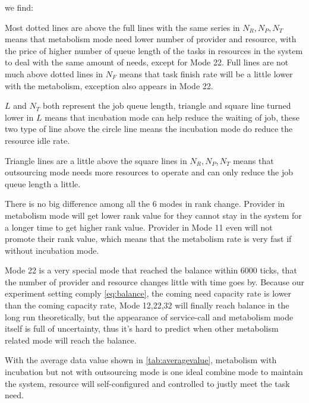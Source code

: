 we find: \begin{asparaenum}[1)]
\item Most dotted lines are above the full lines with the same series in $N_R,N_P,N_T$ means that metabolism mode need lower number of provider and resource, with the price of higher number of queue length of the tasks in resources in the system to deal with the same amount of needs, except for Mode 22. Full lines are not much above dotted lines in $N_F$ means that task finish rate will be a little lower with the metabolism, exception also appears in Mode 22.
\item $L$ and $N_T$ both represent the job queue length, triangle and square line turned lower in $L$ means that incubation mode can help reduce the waiting of job, these two type of line above the circle line means the incubation mode do reduce the resource idle rate.
\item Triangle lines are a little above the square lines in $N_R,N_P,N_T$ means that outsourcing mode needs more resources to operate and can only reduce the job queue length a little.
\item There is no big difference among all the 6 modes in rank change. Provider in metabolism mode will get lower rank value for they cannot stay in the system for a longer time to get higher rank value. Provider in Mode 11 even will not promote their rank value, which means that the metabolism rate is very fast if without incubation mode.
\item Mode 22 is a very special mode that reached the balance within 6000 ticks, that the number of provider and resource changes little with time goes by. Because our experiment setting comply \autoref{eq:balance}, the coming need capacity rate is lower than the coming capacity rate, Mode 12,22,32 will finally reach balance in the long run theoretically, but the appearance of service-call and metabolism mode itself is full of uncertainty, thus it's hard to predict when other metabolism related mode will reach the balance.
\item With the average data value shown in \autoref{tab:averagevalue}, metabolism with incubation but not with outsourcing mode is one ideal combine mode to maintain the system, resource will self-configured and controlled to justly meet the task need.
\end{asparaenum}
